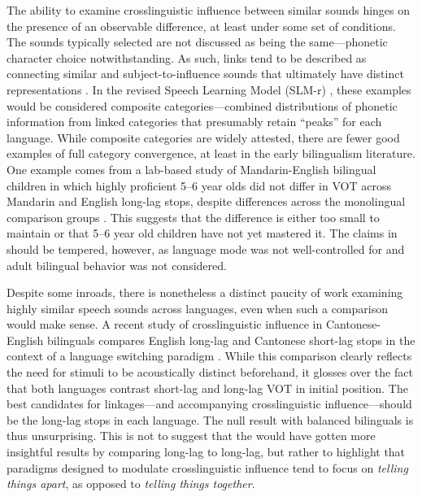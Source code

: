 The ability to examine crosslinguistic influence between similar sounds hinges on the presence of an observable difference, at least under some set of conditions. The sounds typically selected are not discussed as being the same---phonetic character choice notwithstanding. As such, links tend to be described as connecting similar and subject-to-influence sounds that ultimately have distinct representations \citep{antoniou_2010_context,simonet_2016_bilingualism,bullock_2009_sociophonetics}. In the revised Speech Learning Model (SLM-r) \citep{flege_2021_slmr}, these examples would be considered composite categories---combined distributions of phonetic information from linked categories that presumably retain ``peaks'' for each language. While composite categories are widely attested, there are fewer good examples of full category convergence, at least in the early bilingualism literature. One example comes from a lab-based study of Mandarin-English bilingual children in which highly proficient 5--6 year olds did not differ in VOT across Mandarin and English long-lag stops, despite differences across the monolingual comparison groups \citep{yang_2019_vot}. This suggests that the difference is either too small to maintain or that 5--6 year old children have not yet mastered it. The claims in \citep{yang_2019_vot} should be tempered, however, as language mode was not well-controlled for and adult bilingual behavior was not considered.

Despite some inroads, there is nonetheless a distinct paucity of work examining highly similar speech sounds across languages, even when such a comparison would make sense. A recent study of crosslinguistic influence in Cantonese-English bilinguals compares English long-lag and Cantonese short-lag stops in the context of a language switching paradigm \citep{tsui_2019_switching}. While this comparison clearly reflects the need for stimuli to be acoustically distinct beforehand, it glosses over the fact that both languages contrast short-lag and long-lag VOT in initial position. The best candidates for linkages---and accompanying crosslinguistic influence---should be the long-lag stops in each language. The null result with balanced bilinguals is thus unsurprising. This is not to suggest that the \citep{tsui_2019_switching} would have gotten more insightful results by comparing long-lag to long-lag, but rather to highlight that paradigms designed to modulate crosslinguistic influence tend to focus on \textit{telling things apart}, as opposed to \textit{telling things together}.

